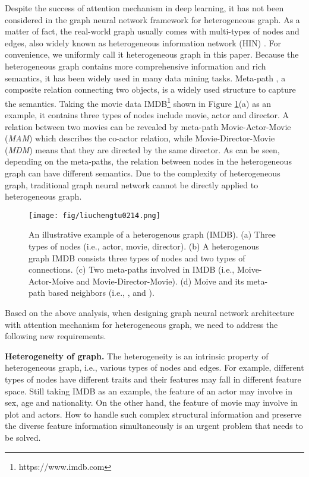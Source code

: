 Despite the success of attention mechanism in deep learning, it has not been considered in the graph neural network framework for heterogeneous graph. As a matter of fact, the real-world graph usually comes with multi-types of nodes and edges, 
also widely known as heterogeneous information network (HIN) \cite{Shi2017ASO}. For convenience, we uniformly call it heterogeneous graph in this paper.
Because the heterogeneous graph contains more comprehensive information and rich semantics, it has been widely used in many data mining tasks. Meta-path \cite{sun2011pathsim}, a composite relation connecting two objects, is a widely used structure to capture the semantics. 
Taking the movie data IMDB\footnote{https://www.imdb.com} shown in Figure \ref{fig_hin}(a) as an example, it contains three types of nodes include movie, actor and director.
A relation between two movies can be revealed by meta-path Movie-Actor-Movie (\emph{MAM}) which describes the co-actor relation,
while Movie-Director-Movie (\emph{MDM}) means that they are directed by the same director.
As can be seen, depending on the meta-paths,
the relation between nodes in the heterogeneous graph can have different semantics.
Due to the complexity of heterogeneous graph, traditional graph neural network cannot be directly applied to heterogeneous graph.
\begin{figure}
\centering
	\texttt{[image: fig/liuchengtu0214.png]}
\caption{
		An illustrative example of a heterogenous graph (IMDB). 
		(a) Three types of nodes (i.e., actor, movie, director).
		(b) A heterogenous graph IMDB  consists three types of nodes  and two types of connections.
		(c) Two meta-paths involved in IMDB (i.e., Moive-Actor-Moive and Movie-Director-Movie). (d) Moive  and its meta-path based neighbors (i.e., ,  and ). 
	}
	\label{fig_hin}
\end{figure}

Based on the above analysis, when designing graph neural network architecture with attention mechanism for heterogeneous graph, 
we need to address the following new requirements.

\textbf{Heterogeneity of graph.}
The heterogeneity is an intrinsic property of heterogeneous graph, i.e., various types of nodes and edges.
For example, different types of nodes have different traits and their features may fall in different feature space. Still taking IMDB as an example, the feature of an actor may involve in sex, age and nationality. On the other hand, the feature of movie may involve in plot and actors. 
How to handle such complex structural information and  preserve the diverse feature information simultaneously is an urgent problem that needs to be solved. 


